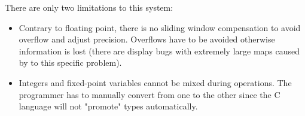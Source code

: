 There are only two limitations to this system:
\begin{itemize}
  \item Contrary to floating point, there is no sliding window compensation to avoid overflow and adjust precision. Overflows have to be avoided otherwise information is lost (there are display bugs with extremely large maps caused by to this specific problem). 
  \item Integers and fixed-point variables cannot be mixed during operations. The programmer has to manually convert from one to the other since the C language will not "promote" types automatically.
\end{itemize}
 


\pagebreak

